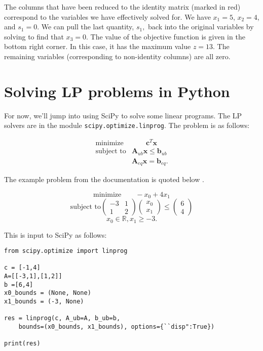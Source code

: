 \documentclass[12pt,english]{article}
\begin{document}
The columns that have been reduced to the identity matrix (marked in red) correspond to the variables we have effectively solved for.  We have $x_1 = 5$, $x_2 = 4$, and $s_1 = 0$.  We can pull the last quantity, $s_1,$ back into the original variables by solving to find that $x_3 = 0$.  The value of the objective function is given in the bottom right corner.  In this case, it has the maximum value $z = 13$.  The remaining variables (corresponding to non-identity columns) are all zero.

\section{Solving LP problems in Python}

For now, we'll jump into using SciPy to solve some linear programs.   The LP solvers are in the module \texttt{scipy.optimize.linprog}.   The problem is as follows:

$$
\begin{array}{lc}
\text{minimize} & \qquad \mathbf{c}^T \mathbf{x} \\
\text{subject to} 
& \mathbf{A}_{ub} \mathbf{x} \leq \mathbf{b}_{ub}  \\
& \mathbf{A}_{eq} \mathbf{x} = \mathbf{b}_{eq}.
\end{array}
$$

The example problem from the documentation is quoted below \cite{}.


$$
\text{minimize} \qquad -x_0 + 4x_1
$$
$$
\text{subject to}
\left(
\begin{array}{cc}
-3 & 1 \\
1 & 2 
\end{array}
\right)
\left(
\begin{array}{c}
x_0 \\
x_1
\end{array}
\right)
\leq 
\left(
\begin{array}{c}
6 \\
4
\end{array}
\right)
$$
$$
 x_0 \in \mathbb{R}, x_1 \geq -3.
$$

\noindent This is input to SciPy as follows:

\begin{lstlisting}
from scipy.optimize import linprog

c = [-1,4]
A=[[-3,1],[1,2]]
b =[6,4]
x0_bounds = (None, None)
x1_bounds = (-3, None)

res = linprog(c, A_ub=A, b_ub=b, 
	bounds=(x0_bounds, x1_bounds), options={``disp":True})
	
print(res)

\end{lstlisting}
\end{document}
